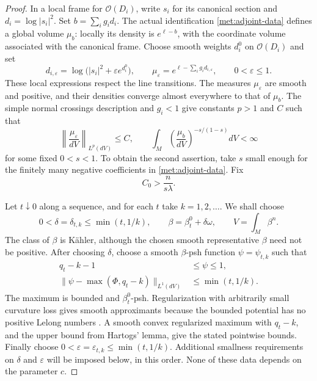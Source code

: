 \documentclass[11pt,letterpaper]{article}
\theoremstyle{definition}
\theoremstyle{remark}
\begin{document}
\begin{proof}
In a local frame for \(\mathcal{O}(D_i)\), write \(s_i\) for its canonical
section and \(d_i=\log|s_i|^2\).  Set \(b=\sum_i g_i d_i\).
The actual identification \eqref{met:adjoint-data} defines a global
volume \(\mu_b\): locally its density is \(e^{\ell-b}\), with the
coordinate volume associated with the canonical frame.  Choose smooth
weights \(d_i^0\) on \(\mathcal{O}(D_i)\) and set
\begin{equation}
 \label{met:regularized-density}
 d_{i,\varepsilon}
   =\log\bigl(|s_i|^2+\varepsilon e^{d_i^0}\bigr),
 \qquad
 \mu_\varepsilon=e^{\ell-\sum_i g_i d_{i,\varepsilon}},
 \qquad 0<\varepsilon\leq1.
\end{equation}
These local expressions respect the line transitions.  The measures
\(\mu_\varepsilon\) are smooth and positive, and their densities converge
almost everywhere to that of \(\mu_b\).  The simple normal crossings
description and \(g_i<1\) give constants \(p>1\) and \(C\) such that
\begin{equation}
 \label{met:density-moments}
 \left\|\frac{\mu_\varepsilon}{dV}\right\|_{L^p(dV)}\leq C,
 \qquad
 \int_M\left(\frac{\mu_b}{dV}\right)^{-s/(1-s)}dV<\infty
\end{equation}
for some fixed \(0<s<1\).  To obtain the second assertion, take \(s\)
small enough for the finitely many negative coefficients in
\eqref{met:adjoint-data}.  Fix
\begin{equation}
 \label{met:C-zero}
 C_0>\frac{n}{s\lambda}.
\end{equation}

Let \(t\downarrow0\) along a sequence, and for each \(t\) take
\(k=1,2,\ldots\).  We shall choose
\[
 0<\delta=\delta_{t,k}\leq\min(t,1/k),
 \qquad
 \beta=\beta_t^0+\delta\omega,
 \qquad
 V=\int_M\beta^n.
\]
The class of \(\beta\) is K\"ahler, although the chosen smooth
representative \(\beta\) need not be positive.  After choosing
\(\delta\), choose a smooth \(\beta\)-psh function \(\psi=\psi_{t,k}\)
such that
\begin{equation}
 \label{met:psi-approximation}
 \begin{split}
 q_t-k-1&\leq\psi\leq1,\\
 \bigl\|\psi-\max(\Phi,q_t-k)\bigr\|_{L^1(dV)}
    &\leq\min(t,1/k).
 \end{split}
\end{equation}
The maximum is bounded and \(\beta_t^0\)-psh.  Regularization with
arbitrarily small curvature loss gives smooth approximants because
the bounded potential has no positive Lelong numbers
\cite{DemaillyRegularization}.  A smooth convex regularized maximum with
\(q_t-k\), and the upper bound from Hartogs' lemma, give the stated
pointwise bounds.  Finally choose
\(0<\varepsilon=\varepsilon_{t,k}\leq\min(t,1/k)\).
Additional smallness requirements on \(\delta\) and \(\varepsilon\)
will be imposed below, in this order.  None of these data depends on
the parameter \(c\).


\end{proof}
\end{document}
